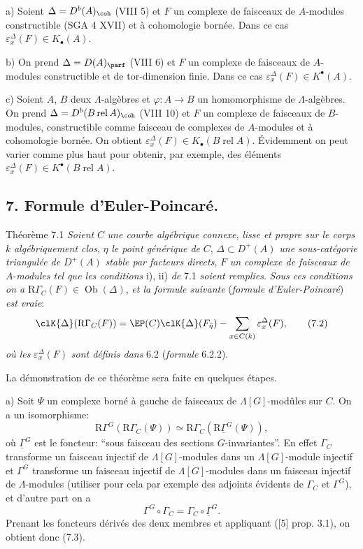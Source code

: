 a) Soient $\Delta=D^b(A)_{\coh}$ (VIII 5) et $F$ un complexe de faisceaux de $A$-modules constructible (SGA 4 XVII) et à cohomologie bornée. Dans ce cas $\varepsilon_x^\Delta(F)\in K_\bullet(A)$.

b) On prend $\Delta=D(A)_{\parf}$ (VIII 6) et $F$ un complexe de faisceaux de $A$-modules constructible et de tor-dimension finie. Dans ce cas $\varepsilon_x^\Delta(F)\in K^{\bullet}(A)$.

c) Soient $A$, $B$ deux $\Lambda$-algèbres et $\varphi:A\to B$ un homomorphisme de $\Lambda$-algèbres. On prend $\Delta=D^b(B\operatorname{ rel }A)_{\coh}$ (VIII 10) et $F$ un complexe de faisceaux de $B$-modules, constructible comme faisceau de complexes de $A$-modules et à cohomologie bornée. On obtient $\varepsilon_x^\Delta(F)\in K_\bullet(B\operatorname{ rel }A)$. Évidemment on peut varier comme plus haut pour obtenir, par exemple, des éléments $\varepsilon_x^\Delta(F)\in K^{\bullet}(B\operatorname{ rel }A)$.

\subsection*{7. Formule d'Euler-Poincaré.}

\begin{statement}{Théorème 7.1}
\emph{Soient} $C$ \emph{une courbe algébrique connexe}, \emph{lisse et propre sur le corps} $k$ \emph{algébriquement clos}, $\eta$ \emph{le point générique de} $C$, $\Delta\subset D^+(A)$ \emph{une sous-catégorie triangulée de} $D^+(A)$ \emph{stable par facteurs directs}, $F$ \emph{un complexe de faisceaux de} $A$-\emph{modules tel que les conditions} i), ii) \emph{de} 7.1 \emph{soient remplies}. \emph{Sous ces conditions on a} $\mathrm{R}\Gamma_C(F)\in\operatorname{Ob}(\Delta)$, \emph{et la formule suivante} (\emph{formule d'Euler-Poincaré}) \emph{est vraie}:
\[
\clK{\Delta}(\mathrm{R}\Gamma_C(F))
=
\EP(C)\clK{\Delta}(F_{\bar\eta})
-\sum_{x\in C(k)}\varepsilon_x^\Delta(F),
\tag{7.2}
\]
\emph{où les} $\varepsilon_x^\Delta(F)$ \emph{sont définis dans} 6.2 (\emph{formule} 6.2.2).
\end{statement}

La
démonstration de ce théorème sera faite en quelques étapes.

a) Soit $\Psi$ un complexe borné à gauche de faisceaux de $\Lambda[G]$-modûles sur $C$. On a un isomorphisme:
\[
\mathrm{R}\Gamma^G(\mathrm{R}\Gamma_C(\Psi))\simeq\mathrm{R}\Gamma_C(\mathrm{R}\underline{\Gamma}^G(\Psi)),
\tag{7.3}
\]
où $\underline{\Gamma}^G$ est le foncteur: ``sous faisceau des sections $G$-invariantes''. En effet $\Gamma_C$ transforme un faisceau injectif de $\Lambda[G]$-modules dans un $\Lambda[G]$-module injectif et $\Gamma^G$ transforme un faisceau injectif de $\Lambda[G]$-modules dans un faisceau injectif de $\Lambda$-modules (utiliser pour cela par exemple des adjoints évidents de $\Gamma_C$ et $\Gamma^G$), et d'autre part on a
\[
\Gamma^G\circ\Gamma_C=\Gamma_C\circ\underline{\Gamma}^G.
\]
Prenant les foncteurs dérivés des deux membres et appliquant ([5] prop. 3.1), on obtient donc (7.3).


